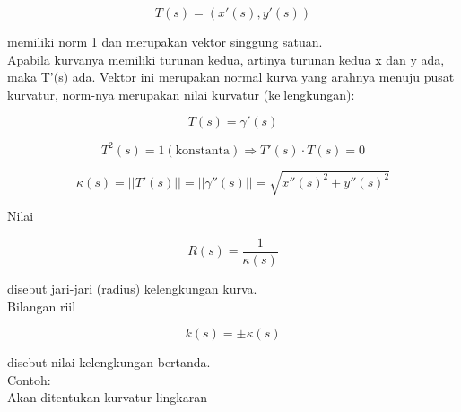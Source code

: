 \documentclass[a4paper,10pt]{article}
\begin{document}
\begin{eulernotebook}
\begin{eulercomment}
\begin{eulercomment}
\begin{eulercomment}
\begin{eulercomment}
\begin{eulercomment}
\begin{eulercomment}
\begin{eulercomment}
\begin{eulercomment}
\begin{eulercomment}
\begin{eulercomment}
\begin{eulercomment}
\begin{eulercomment}
\begin{eulercomment}
\begin{eulercomment}
\begin{eulercomment}
\begin{eulercomment}
\begin{eulercomment}
\begin{eulercomment}
\begin{eulercomment}
\begin{eulercomment}
\begin{eulercomment}
\begin{eulercomment}
\begin{eulercomment}
\end{eulercomment}
\begin{eulerformula}
\[
T(s)=(x'(s),y'(s))
\]
\end{eulerformula}
\begin{eulercomment}
memiliki norm 1 dan merupakan vektor singgung satuan.\\
Apabila kurvanya memiliki turunan kedua, artinya turunan kedua x dan y
ada, maka T’(s) ada. Vektor ini merupakan normal kurva yang arahnya
menuju pusat kurvatur, norm-nya merupakan nilai kurvatur
(kelengkungan):

\end{eulercomment}
\begin{eulerformula}
\[
T(s)=\gamma'(s)
\]
\end{eulerformula}
\begin{eulerformula}
\[
T^2(s)=1(\text{konstanta})\Rightarrow T'(s)\cdot T(s)=0
\]
\end{eulerformula}
\begin{eulerformula}
\[
\kappa(s)=||T'(s)||=||\gamma''(s)||=\sqrt{x''(s)^2+y''(s)^2}
\]
\end{eulerformula}
\begin{eulercomment}
Nilai

\end{eulercomment}
\begin{eulerformula}
\[
R(s)=\frac{1}{\kappa(s)}
\]
\end{eulerformula}
\begin{eulercomment}
disebut jari-jari (radius) kelengkungan kurva.\\
Bilangan riil

\end{eulercomment}
\begin{eulerformula}
\[
k(s)=\pm \kappa(s)
\]
\end{eulerformula}
\begin{eulercomment}
disebut nilai kelengkungan bertanda.\\
Contoh:\\
Akan ditentukan kurvatur lingkaran


\end{eulercomment}
\end{eulercomment}
\end{eulercomment}
\end{eulercomment}
\end{eulercomment}
\end{eulercomment}
\end{eulercomment}
\end{eulercomment}
\end{eulercomment}
\end{eulercomment}
\end{eulercomment}
\end{eulercomment}
\end{eulercomment}
\end{eulercomment}
\end{eulercomment}
\end{eulercomment}
\end{eulercomment}
\end{eulercomment}
\end{eulercomment}
\end{eulercomment}
\end{eulercomment}
\end{eulercomment}
\end{eulercomment}
\end{eulernotebook}
\end{document}
